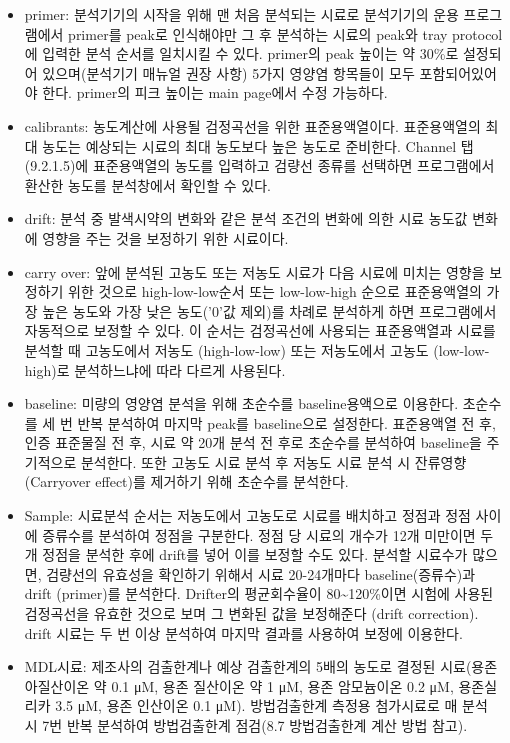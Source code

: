 \documentclass[
]{book}
\begin{document}
\begin{itemize}
\item
  primer: 분석기기의 시작을 위해 맨 처음 분석되는 시료로 분석기기의 운용 프로그램에서 primer를 peak로 인식해야만 그 후 분석하는 시료의 peak와 tray protocol에 입력한 분석 순서를 일치시킬 수 있다. primer의 peak 높이는 약 30\%로 설정되어 있으며(분석기기 매뉴얼 권장 사항) 5가지 영양염 항목들이 모두 포함되어있어야 한다. primer의 피크 높이는 main page에서 수정 가능하다.
\item
  calibrants: 농도계산에 사용될 검정곡선을 위한 표준용액열이다. 표준용액열의 최대 농도는 예상되는 시료의 최대 농도보다 높은 농도로 준비한다. Channel 탭(9.2.1.5)에 표준용액열의 농도를 입력하고 검량선 종류를 선택하면 프로그램에서 환산한 농도를 분석창에서 확인할 수 있다.
\item
  drift: 분석 중 발색시약의 변화와 같은 분석 조건의 변화에 의한 시료 농도값 변화에 영향을 주는 것을 보정하기 위한 시료이다.
\item
  carry over: 앞에 분석된 고농도 또는 저농도 시료가 다음 시료에 미치는 영향을 보정하기 위한 것으로 high-low-low순서 또는 low-low-high 순으로 표준용액열의 가장 높은 농도와 가장 낮은 농도('0'값 제외)를 차례로 분석하게 하면 프로그램에서 자동적으로 보정할 수 있다. 이 순서는 검정곡선에 사용되는 표준용액열과 시료를 분석할 때 고농도에서 저농도 (high-low-low) 또는 저농도에서 고농도 (low-low-high)로 분석하느냐에 따라 다르게 사용된다.
\item
  baseline: 미량의 영양염 분석을 위해 초순수를 baseline용액으로 이용한다. 초순수를 세 번 반복 분석하여 마지막 peak를 baseline으로 설정한다. 표준용액열 전 후, 인증 표준물질 전 후, 시료 약 20개 분석 전 후로 초순수를 분석하여 baseline을 주기적으로 분석한다. 또한 고농도 시료 분석 후 저농도 시료 분석 시 잔류영향(Carryover effect)를 제거하기 위해 초순수를 분석한다.
\item
  Sample: 시료분석 순서는 저농도에서 고농도로 시료를 배치하고 정점과 정점 사이에 증류수를 분석하여 정점을 구분한다. 정점 당 시료의 개수가 12개 미만이면 두 개 정점을 분석한 후에 drift를 넣어 이를 보정할 수도 있다. 분석할 시료수가 많으면, 검량선의 유효성을 확인하기 위해서 시료 20-24개마다 baseline(증류수)과 drift (primer)를 분석한다. Drifter의 평균회수율이 80\textasciitilde120\%이면 시험에 사용된 검정곡선을 유효한 것으로 보며 그 변화된 값을 보정해준다 (drift correction). drift 시료는 두 번 이상 분석하여 마지막 결과를 사용하여 보정에 이용한다.
\item
  MDL시료: 제조사의 검출한계나 예상 검출한계의 5배의 농도로 결정된 시료(용존 아질산이온 약 0.1 μM, 용존 질산이온 약 1 μM, 용존 암모늄이온 0.2 μM, 용존실리카 3.5 μM, 용존 인산이온 0.1 μM). 방법검출한계 측정용 첨가시료로 매 분석 시 7번 반복 분석하여 방법검출한계 점검(8.7 방법검출한계 계산 방법 참고).

\end{itemize}
\end{document}
